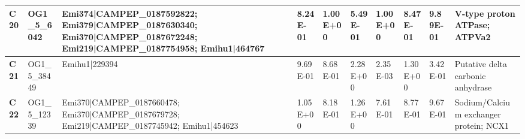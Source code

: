 \begin{landscape}
\begin{center}
\begin{footnotesize}
\begin{longtable}{|p{0.5cm}|p{1.5cm}|p{4cm}|l|l|l|l|l|l|l|}
\textbf{C20} & OG1\_5\_6042  & Emi374|CAMPEP\_0187592822; Emi379|CAMPEP\_0187630340; Emi370|CAMPEP\_0187672248; Emi219|CAMPEP\_0187754958; Emihu1|464767                                                                                                                                                                                                                                                                                                                                                                                                                                                                                                                & 8.24E-01  & 1.00E+00 & 5.49E-01  & 1.00E+00 & 8.47E-01  & 9.89E-01 & V-type proton ATPase; ATPVa2                                                 \\ \hline
\textbf{C21} & OG1\_5\_38449 & Emihu1|229394                                                                                                                                                                                                                                                                                                                                                                                                                                                                                                                                                                                                                            & 9.69E-01  & 8.68E-01 & 2.28E+00  & 2.35E-03 & 1.30E+00  & 3.42E-01 & Putative delta carbonic anhydrase                                            \\ \hline
\textbf{C22} & OG1\_5\_12339 & Emi370|CAMPEP\_0187660478; Emi370|CAMPEP\_0187679728; Emi219|CAMPEP\_0187745942; Emihu1|454623                                                                                                                                                                                                                                                                                                                                                                                                                                                                                                                                           & 1.05E+00  & 8.18E-01 & 1.26E+00  & 7.61E-01 & 8.77E-01  & 9.67E-01 & Sodium/Calcium exchanger protein; NCX1                                       \\ \hline

\end{longtable}
\end{footnotesize}
\end{center}
\end{landscape}
